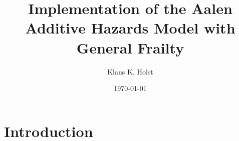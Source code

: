 \documentclass[a4paper,12pt]{article}
\title{Implementation of the Aalen Additive Hazards Model with General
  Frailty}
\author{Klaus K. Holst}
\date{\today}
\theoremstyle{definition}
\begin{document}
\maketitle



\section{Introduction}








\end{document}
